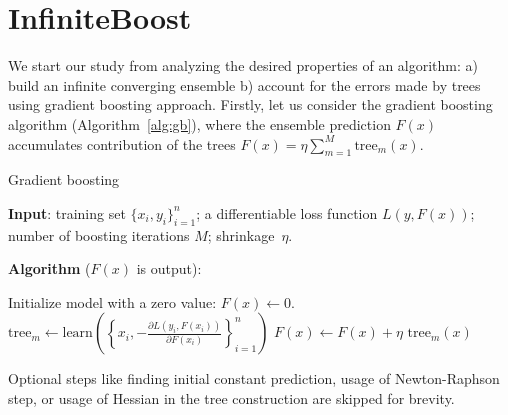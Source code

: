 \section{InfiniteBoost}
We start our study from analyzing the desired properties of an algorithm:
a) build an infinite converging ensemble b) account for the errors made by trees using gradient boosting approach. Firstly, let us consider the gradient boosting algorithm (Algorithm~\ref{alg:gb}),
where the ensemble prediction $F(x)$ accumulates contribution of the trees $ F(x) = \eta \sum_{m=1}^M \text{tree}_m(x) $.

\begin{algorithm}[!h]
  \caption{Gradient boosting}\label{alg:gb}
  {\bf Input}: training set $\{x_i, y_i\}_{i=1}^n$; a differentiable loss function $L(y, F(x))$; number of boosting iterations $M$; shrinkage~$\eta$.

  {\bf Algorithm} ($F(x)$ is output):
  \begin{algorithmic}
    \State Initialize model with a zero value: $F(x) \gets 0$.
      \State $\text{tree}_m \gets \text{learn}\left(\left\{x_i, -\frac{\partial L(y_i, F(x_i))}{\partial F(x_i)}\right\}_{i=1}^n\right)$
      \State $F(x) \gets F(x) + \eta \text{ tree}_m(x)$
    \EndFor
  \end{algorithmic}

  Optional steps like finding initial constant prediction, usage of Newton-Raphson step,
  or usage of Hessian in the tree construction are skipped for brevity.
\end{algorithm}

